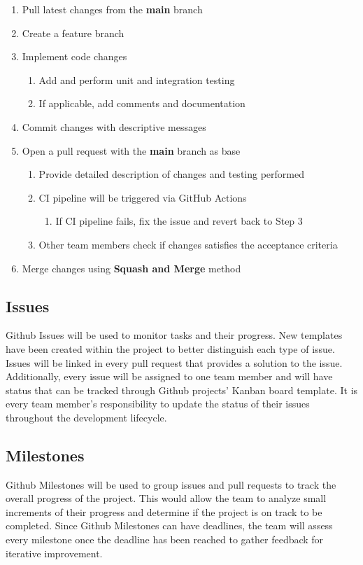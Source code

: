 \documentclass{article}
\begin{document}
\begin{enumerate}
  \item Pull latest changes from the \textbf{main} branch
  \item Create a feature branch
  \item Implement code changes
  \begin{enumerate}
    \item Add and perform unit and integration testing
    \item If applicable, add comments and documentation
  \end{enumerate}
  \item Commit changes with descriptive messages
  \item Open a pull request with the \textbf{main} branch as base
  \begin{enumerate}
    \item Provide detailed description of changes and testing performed
    \item CI pipeline will be triggered via GitHub Actions
    \begin{enumerate}
      \item  If CI pipeline fails, fix the issue and revert back to Step 3
    \end{enumerate}
    \item Other team members check if changes satisfies the acceptance criteria
  \end{enumerate}
  \item Merge changes using \textbf{Squash and Merge} method
\end{enumerate}


\subsection{Issues}
Github Issues will be used to monitor tasks and their progress. New templates have been created within the project to better distinguish each type of issue. Issues will be linked in every pull request that provides a solution to the issue. Additionally, every issue will be assigned to one team member and will have status that can be tracked through Github projects’ Kanban board template. It is every team member’s responsibility to update the status of their issues throughout the development lifecycle.

\subsection{Milestones}
Github Milestones will be used to group issues and pull requests to track the overall progress of the project. This would allow the team to analyze small increments of their progress and determine if the project is on track to be completed. Since Github Milestones can have deadlines, the team will assess every milestone once the deadline has been reached to gather feedback for iterative improvement.
\end{document}
